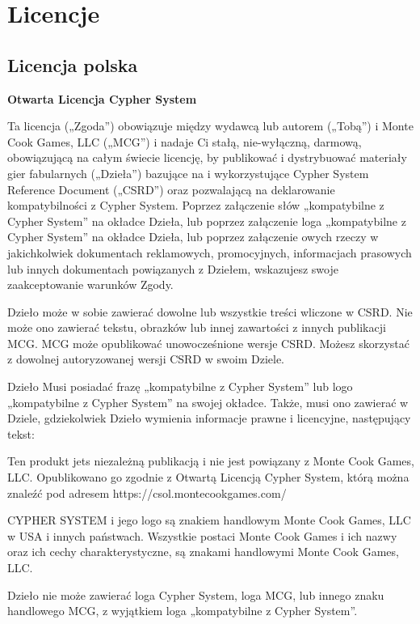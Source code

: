 \chapter{Licencje}

\section{Licencja polska}

\textbf{Otwarta Licencja Cypher System}

Ta licencja („Zgoda”) obowiązuje między wydawcą lub autorem („Tobą”) i Monte Cook Games, LLC („MCG”) i nadaje Ci stałą, nie-wyłączną, darmową, obowiązującą na całym świecie licencję, by publikować i dystrybuować materiały gier fabularnych („Dzieła”) bazujące na i wykorzystujące Cypher System Reference Document („CSRD”) oraz pozwalającą na deklarowanie kompatybilności z Cypher System. Poprzez załączenie słów „kompatybilne z Cypher System” na okładce Dzieła, lub poprzez załączenie loga „kompatybilne z Cypher System” na okładce Dzieła, lub poprzez załączenie owych rzeczy w jakichkolwiek dokumentach reklamowych, promocyjnych, informacjach prasowych lub innych dokumentach powiązanych z Dziełem, wskazujesz swoje zaakceptowanie warunków Zgody.

Dzieło może w sobie zawierać dowolne lub wszystkie treści wliczone w CSRD. Nie może ono zawierać tekstu, obrazków lub innej zawartości z innych publikacji MCG. MCG może opublikować unowocześnione wersje CSRD. Możesz skorzystać z dowolnej autoryzowanej wersji CSRD w swoim Dziele.

Dzieło Musi posiadać frazę „kompatybilne z Cypher System” lub logo „kompatybilne z Cypher System” na swojej okładce. Także, musi ono zawierać w Dziele, gdziekolwiek Dzieło wymienia informacje prawne i licencyjne, następujący tekst:

\begin{displayquote}
Ten produkt jets niezależną publikacją i nie jest powiązany z Monte Cook Games, LLC. Opublikowano go zgodnie z Otwartą Licencją Cypher System, którą można znaleźć pod adresem https://csol.montecookgames.com/ 

CYPHER SYSTEM i jego logo są znakiem handlowym Monte Cook Games, LLC w USA i innych państwach. Wszystkie postaci Monte Cook Games i ich nazwy oraz ich cechy charakterystyczne, są znakami handlowymi Monte Cook Games, LLC.
\end{displayquote}

Dzieło nie może zawierać loga Cypher System, loga MCG, lub innego znaku handlowego MCG, z wyjątkiem loga „kompatybilne z Cypher System”.

